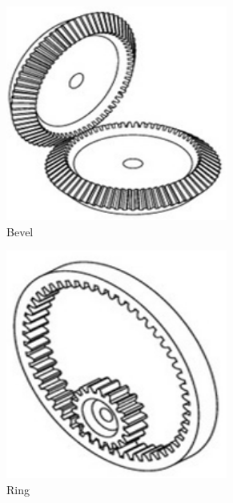 \begin{figure}[H]
	\begin{subfigure}[b]{.32\linewidth}
		\includegraphics[width=0.8\textwidth]{imgs/gear_bevel.png}
		\caption{Bevel}
	\end{subfigure}\begin{subfigure}[b]{.32\linewidth}
		\includegraphics[width=0.8\textwidth]{imgs/gear_ring.png}
		\caption{Ring}
	\end{subfigure}\begin{subfigure}[b]{.32\linewidth}

\end{subfigure}
\end{figure}
